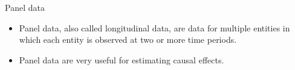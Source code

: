 \documentclass[presentation]{beamer}
\begin{document}
\begin{frame}[label={sec:org9928999}]{Panel data}
\begin{itemize}
\item \alert{Panel data}, also called \alert{longitudinal data}, are data for multiple
entities in which \alert{each entity} is observed at two or more time
periods.
\item Panel data are very useful for estimating causal effects.
\end{itemize}
\end{frame}
\end{document}

